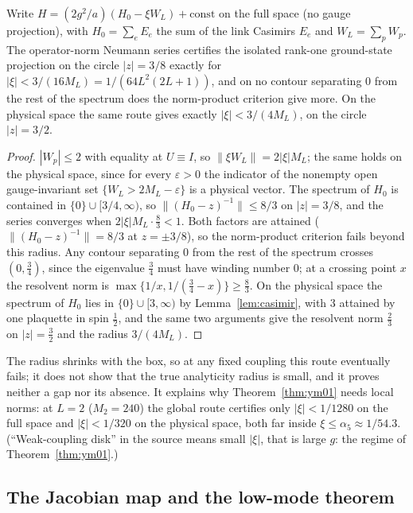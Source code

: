 \begin{proposition}\label{prop:neumann}
Write $H=(2g^2/a)(H_0-\xi W_L)+\mathrm{const}$ on the full space (no gauge projection), with $H_0=\sum_eE_e$ the sum of the link Casimirs $E_e$ and $W_L=\sum_pW_p$. The operator-norm Neumann series certifies the isolated rank-one ground-state projection on the circle $|z|=3/8$ exactly for $|\xi|<3/(16M_L)=1/(64L^2(2L+1))$, and on no contour separating $0$ from the rest of the spectrum does the norm-product criterion give more. On the physical space the same route gives exactly $|\xi|<3/(4M_L)$, on the circle $|z|=3/2$.
\end{proposition}
\begin{proof}
$|W_p|\le2$ with equality at $U\equiv I$, so $\|\xi W_L\|=2|\xi|M_L$; the same holds on the physical space, since for every $\varepsilon>0$ the indicator of the nonempty open gauge-invariant set $\{W_L>2M_L-\varepsilon\}$ is a physical vector. The spectrum of $H_0$ is contained in $\{0\}\cup[3/4,\infty)$, so $\|(H_0-z)^{-1}\|\le8/3$ on $|z|=3/8$, and the series converges when $2|\xi|M_L\cdot\frac83<1$. Both factors are attained ($\|(H_0-z)^{-1}\|=8/3$ at $z=\pm3/8$), so the norm-product criterion fails beyond this radius. Any contour separating $0$ from the rest of the spectrum crosses $(0,\frac34)$, since the eigenvalue $\frac34$ must have winding number $0$; at a crossing point $x$ the resolvent norm is $\max\{1/x,1/(\frac34-x)\}\ge\frac83$. On the physical space the spectrum of $H_0$ lies in $\{0\}\cup[3,\infty)$ by Lemma~\ref{lem:casimir}, with $3$ attained by one plaquette in spin $\frac12$, and the same two arguments give the resolvent norm $\frac23$ on $|z|=\frac32$ and the radius $3/(4M_L)$.
\end{proof}
The radius shrinks with the box, so at any fixed coupling this route eventually fails; it does not show that the true analyticity radius is small, and it proves neither a gap nor its absence. It explains why Theorem~\ref{thm:ym01} needs local norms: at $L=2$ ($M_2=240$) the global route certifies only $|\xi|<1/1280$ on the full space and $|\xi|<1/320$ on the physical space, both far inside $\xi\le\alpha_5\approx1/54.3$. (``Weak-coupling disk'' in the source means small $|\xi|$, that is large $g$: the regime of Theorem~\ref{thm:ym01}.)

\subsection{The Jacobian map and the low-mode theorem}

